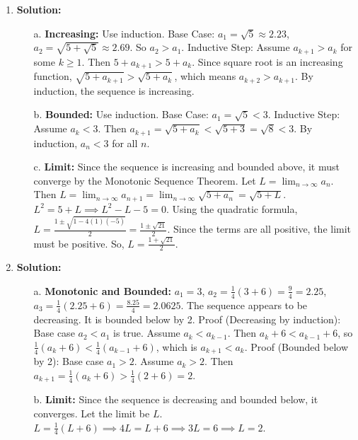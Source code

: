 \documentclass{article}
\begin{document}
\begin{enumerate}
    \item \textbf{Solution:}
    \begin{itemize}
        \item[a.] \textbf{Increasing:} Use induction. Base Case: $a_1 = \sqrt{5} \approx 2.23$, $a_2 = \sqrt{5+\sqrt{5}} \approx 2.69$. So $a_2 > a_1$.
        Inductive Step: Assume $a_{k+1} > a_k$ for some $k \ge 1$. Then $5+a_{k+1} > 5+a_k$. Since square root is an increasing function, $\sqrt{5+a_{k+1}} > \sqrt{5+a_k}$, which means $a_{k+2} > a_{k+1}$. By induction, the sequence is increasing.
        \item[b.] \textbf{Bounded:} Use induction. Base Case: $a_1 = \sqrt{5} < 3$.
        Inductive Step: Assume $a_k < 3$. Then $a_{k+1} = \sqrt{5+a_k} < \sqrt{5+3} = \sqrt{8} < 3$. By induction, $a_n < 3$ for all $n$.
        \item[c.] \textbf{Limit:} Since the sequence is increasing and bounded above, it must converge by the Monotonic Sequence Theorem. Let $L = \lim_{n \to \infty} a_n$.
        Then $L = \lim_{n \to \infty} a_{n+1} = \lim_{n \to \infty} \sqrt{5+a_n} = \sqrt{5+L}$.
        $L^2 = 5+L \implies L^2 - L - 5 = 0$. Using the quadratic formula, $L = \frac{1 \pm \sqrt{1 - 4(1)(-5)}}{2} = \frac{1 \pm \sqrt{21}}{2}$.
        Since the terms are all positive, the limit must be positive. So, $L = \frac{1 + \sqrt{21}}{2}$.
    \end{itemize}

    \item \textbf{Solution:}
    \begin{itemize}
        \item[a.] \textbf{Monotonic and Bounded:} $a_1=3$, $a_2 = \frac{1}{4}(3+6) = \frac{9}{4}=2.25$, $a_3 = \frac{1}{4}(2.25+6) = \frac{8.25}{4} = 2.0625$. The sequence appears to be decreasing. It is bounded below by 2.
        Proof (Decreasing by induction): Base case $a_2 < a_1$ is true. Assume $a_k < a_{k-1}$. Then $a_k+6 < a_{k-1}+6$, so $\frac{1}{4}(a_k+6) < \frac{1}{4}(a_{k-1}+6)$, which is $a_{k+1} < a_k$.
        Proof (Bounded below by 2): Base case $a_1 > 2$. Assume $a_k > 2$. Then $a_{k+1} = \frac{1}{4}(a_k+6) > \frac{1}{4}(2+6) = 2$.
        \item[b.] \textbf{Limit:} Since the sequence is decreasing and bounded below, it converges. Let the limit be $L$.
        $L = \frac{1}{4}(L+6) \implies 4L = L+6 \implies 3L = 6 \implies L=2$.
    \end{itemize}

\end{enumerate}
\end{document}
